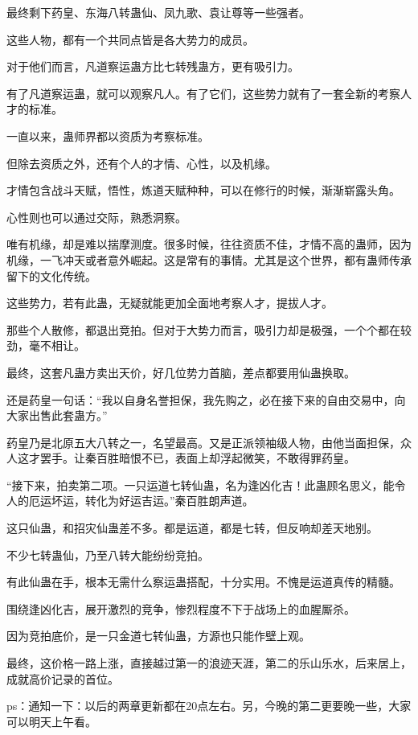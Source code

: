 \begin{this_body}
最终剩下药皇、东海八转蛊仙、凤九歌、袁让尊等一些强者。

这些人物，都有一个共同点皆是各大势力的成员。

对于他们而言，凡道察运蛊方比七转残蛊方，更有吸引力。

有了凡道察运蛊，就可以观察凡人。有了它们，这些势力就有了一套全新的考察人才的标准。

一直以来，蛊师界都以资质为考察标准。

但除去资质之外，还有个人的才情、心性，以及机缘。

才情包含战斗天赋，悟性，炼道天赋种种，可以在修行的时候，渐渐崭露头角。

心性则也可以通过交际，熟悉洞察。

唯有机缘，却是难以揣摩测度。很多时候，往往资质不佳，才情不高的蛊师，因为机缘，一飞冲天或者意外崛起。这是常有的事情。尤其是这个世界，都有蛊师传承留下的文化传统。

这些势力，若有此蛊，无疑就能更加全面地考察人才，提拔人才。

那些个人散修，都退出竞拍。但对于大势力而言，吸引力却是极强，一个个都在较劲，毫不相让。

最终，这套凡蛊方卖出天价，好几位势力首脑，差点都要用仙蛊换取。

还是药皇一句话：“我以自身名誉担保，我先购之，必在接下来的自由交易中，向大家出售此套蛊方。”

药皇乃是北原五大八转之一，名望最高。又是正派领袖级人物，由他当面担保，众人这才罢手。让秦百胜暗恨不已，表面上却浮起微笑，不敢得罪药皇。

“接下来，拍卖第二项。一只运道七转仙蛊，名为逢凶化吉！此蛊顾名思义，能令人的厄运坏运，转化为好运吉运。”秦百胜朗声道。

这只仙蛊，和招灾仙蛊差不多。都是运道，都是七转，但反响却差天地别。

不少七转蛊仙，乃至八转大能纷纷竞拍。

有此仙蛊在手，根本无需什么察运蛊搭配，十分实用。不愧是运道真传的精髓。

围绕逢凶化吉，展开激烈的竞争，惨烈程度不下于战场上的血腥厮杀。

因为竞拍底价，是一只金道七转仙蛊，方源也只能作壁上观。

最终，这价格一路上涨，直接越过第一的浪迹天涯，第二的乐山乐水，后来居上，成就高价记录的首位。

ps：通知一下：以后的两章更新都在20点左右。另，今晚的第二更要晚一些，大家可以明天上午看。

\end{this_body}

